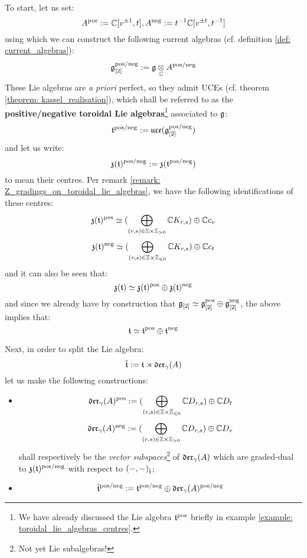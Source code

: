         To start, let us set:
            $$A^{\mathrm{pos}} := \mathbb{C}[v^{\pm 1}, t], A^{\mathrm{neg}} := t^{-1} \mathbb{C}[v^{\pm t}, t^{-1}]$$
        using which we can construct the following current algebras (cf. definition \ref{def: current_algebras}):
            $$\g_{[2]}^{\positive/\negative} := \g \tensor_{\bbC} A^{\positive/\negative}$$
        These Lie algebras are \textit{a priori} perfect, so they admit UCEs (cf. theorem \ref{theorem: kassel_realisation}), which shall be referred to as the \textbf{positive/negative toroidal Lie algebras}\footnote{We have already discussed the Lie algebra $\mathfrak{t}^{\mathrm{pos}}$ briefly in example \ref{example: toroidal_lie_algebras_centres}.} associated to $\mathfrak{g}$:
            $$\mathfrak{t}^{\mathrm{pos}/\mathrm{neg}} := \mathfrak{uce}(\mathfrak{g}_{[2]}^{\mathrm{pos}/\mathrm{neg}})$$
        and let us write:
            $$\mathfrak{z}(\mathfrak{t})^{\mathrm{pos}/\mathrm{neg}} := \mathfrak{z}(\mathfrak{t}^{\mathrm{pos}/\mathrm{neg}})$$
        to mean their centres. Per remark \ref{remark: Z_gradings_on_toroidal_lie_algebras}, we have the following identifications of these centres:
            $$\z(\toroidal)^{\positive} \cong ( \bigoplus_{(r, s) \in \Z \x \Z_{> 0} } \bbC K_{r, s} ) \oplus \bbC c_v$$
            $$\z(\toroidal)^{\negative} \cong ( \bigoplus_{(r, s) \in \Z \x \Z_{\leq 0}} \bbC K_{r, s}) \oplus \bbC c_t$$
        and it can also be seen that:
            $$\mathfrak{z}(\mathfrak{t}) \simeq \mathfrak{z}(\mathfrak{t})^{\mathrm{pos}} \oplus \mathfrak{z}(\mathfrak{t})^{\mathrm{neg}}$$
        and since we already have by construction that $\mathfrak{g}_{[2]} \simeq \mathfrak{g}_{[2]}^{\mathrm{pos}} \oplus \mathfrak{g}_{[2]}^{\mathrm{neg}}$, the above implies that:
            $$\mathfrak{t} \simeq \mathfrak{t}^{\mathrm{pos}} \oplus \mathfrak{t}^{\mathrm{neg}}$$
        
        Next, in order to split the Lie algebra:
            $$\hat{\mathfrak{t}} := \mathfrak{t} \rtimes \mathfrak{der}_{\gamma}(A)$$
        let us make the following constructions:
        \begin{itemize}
            \item
                $$\divzero^{\positive} := ( \bigoplus_{(r, s) \in \Z \x \Z_{\leq 0} } \bbC D_{r, s} ) \oplus \bbC D_t$$
                $$\divzero^{\negative} := ( \bigoplus_{(r, s) \in \Z \x \Z_{> 0} } \bbC D_{r, s} ) \oplus \bbC D_v$$
            shall respectively be the \textit{vector subspaces}\footnote{Not yet Lie subalgebras!} of $\mathfrak{der}_{\gamma}(A)$ which are graded-dual to $\mathfrak{z}(\mathfrak{t})^{\mathrm{pos}/\mathrm{neg}}$ with respect to $(-, -)_{\hat{\mathfrak{t}}}$;
            \item
                $$\hat{\mathfrak{t}}^{\mathrm{pos}/\mathrm{neg}} := \mathfrak{t}^{\mathrm{pos}/\mathrm{neg}} \oplus \mathfrak{der}_{\gamma}(A)^{\mathrm{pos}/\mathrm{neg}}$$
        \end{itemize}


